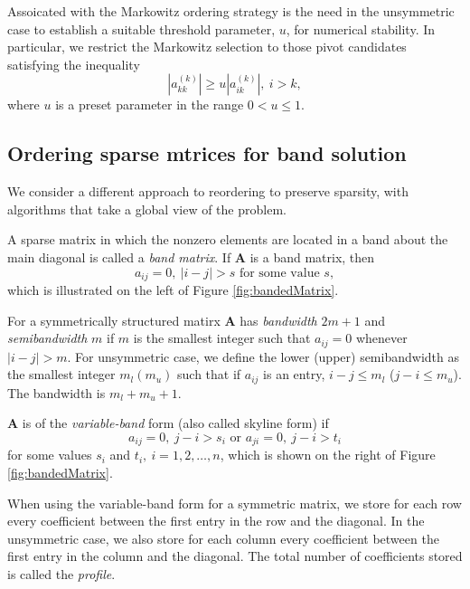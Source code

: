 \begin{alg}
  Assoicated with the Markowitz ordering strategy is the need in the
  unsymmetric case to establish a suitable threshold parameter, $u$,
  for numerical stability. In particular, we restrict the Markowitz
  selection to those pivot candidates satisfying the inequality
  \begin{equation}
    \label{eq:MarkowitzThreshold}
    |a_{kk}^{(k)}|\geq u|a_{ik}^{(k)}|,\ i>k,
  \end{equation}
  where $u$ is a preset parameter in the range $0<u\leq 1$.
\end{alg}

\subsection{Ordering sparse mtrices for band solution}
\label{sec:BandSolution}

\begin{rmk}
We consider a different approach to reordering to preserve sparsity,
with algorithms that take a global view of the problem.
\end{rmk}


\begin{defn}
 A sparse matrix in which the nonzero elements are located in a band
 about the main diagonal is called a \emph{band matrix}. If $\mathbf{A}$ is a band matrix, then
 $$a_{ij}=0,\ |i-j|>s \mbox{ for some value } s,$$
 which is illustrated on the left of Figure \ref{fig:bandedMatrix}.
\end{defn}

\begin{defn}
  For a symmetrically structured matirx $\mathbf{A}$ has \emph{bandwidth} $2m+1$ and
  \emph{semibandwidth} $m$ if $m$ is the smallest integer such that
  $a_{ij}=0$ whenever $|i-j|>m.$ For unsymmetric case, we define the
  lower (upper) semibandwidth as the smallest integer $m_l (m_u)$ such
  that if $a_{ij}$ is an entry, $i-j\leq m_l$ ($j-i\leq m_u$). The
  bandwidth is $m_l+m_u+1.$
\end{defn}

\begin{defn}
  $\mathbf{A}$ is of the \emph{variable-band} form (also called skyline form) if
  $$a_{ij}=0,\ j-i>s_i \mbox{ or } a_{ji}=0,\ j-i>t_i$$
  for some values $s_i$ and $t_i,\ i=1,2,\ldots,n$, which is shown on
  the right of Figure \ref{fig:bandedMatrix}.
\end{defn}

\begin{defn}
  When using the variable-band form for a symmetric matrix, we store
  for each row every coefficient between the first entry in the row
  and the diagonal. In the unsymmetric case, we also store for each
  column every coefficient between the first entry in the column and
  the diagonal. The total number of coefficients stored is called the \emph{profile}.
\end{defn}

